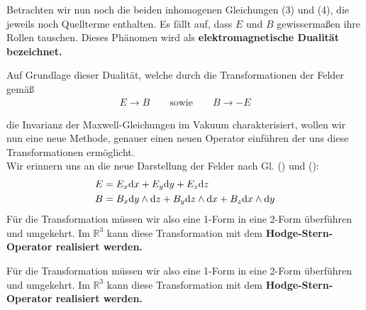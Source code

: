 Betrachten wir nun noch die beiden inhomogenen Gleichungen (3) und (4), die jeweils noch Quellterme enthalten. Es fällt auf, dass $E$ und $B$ gewissermaßen ihre Rollen tauschen. Dieses Phänomen wird als \bfseries elektromagnetische Dualität \normalfont bezeichnet.

Auf Grundlage dieser Dualität, welche durch die Transformationen der Felder gemäß
\begin{align*}
E \rightarrow B \qquad \text{sowie} \qquad B \rightarrow -E
\end{align*}

die Invarianz der Maxwell-Gleichungen im Vakuum charakterisiert, wollen wir nun eine neue Methode, genauer einen neuen Operator einführen der uns diese Transformationen ermöglicht. \\
Wir erinnern uns an die neue Darstellung der Felder nach Gl. () und ():
\begin{align*}
E &= E_x \dd x +E_y \dd y + E_z \dd z   \\
B &= B_x \dd y \wedge \dd z + B_y \dd z \wedge \dd x + B_z \dd x \wedge \dd y 
\end{align*}
Für die Transformation müssen wir also eine 1-Form in eine 2-Form überführen und umgekehrt. Im $\mathbb{R}^3$ kann diese Transformation mit dem \bfseries Hodge-Stern-Operator \normalfont realisiert werden.


Für die Transformation müssen wir also eine 1-Form in eine 2-Form überführen und umgekehrt. Im $\mathbb{R}^3$ kann diese Transformation mit dem \bfseries Hodge-Stern-Operator \normalfont realisiert werden.
